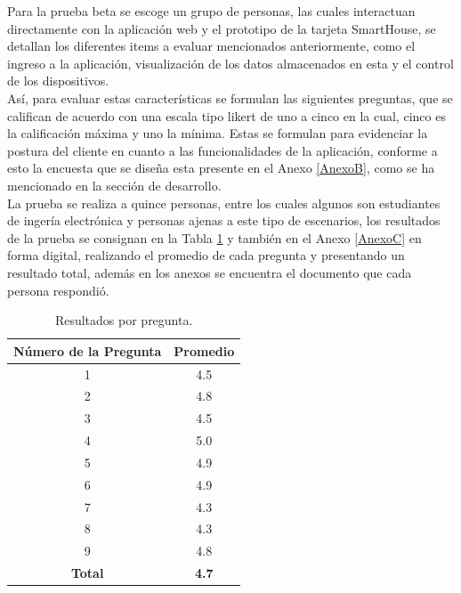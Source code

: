 
Para la prueba beta se escoge un grupo de personas, las cuales interactuan directamente con la aplicación web y el prototipo de la tarjeta SmartHouse, se detallan los diferentes items a evaluar mencionados anteriormente, como el ingreso a la aplicación, visualización de los datos almacenados en esta y el control de los dispositivos.\\

Así, para evaluar estas características se formulan las siguientes preguntas, que se califican de acuerdo con una escala tipo likert \cite{lik} de uno a cinco en la cual, cinco es la calificación máxima y uno la mínima. Estas se formulan para evidenciar la postura del cliente en cuanto a las funcionalidades de la aplicación, conforme a esto la encuesta que se diseña esta presente en el Anexo \ref{AnexoB}, como se ha mencionado en la sección de desarrollo.\\

La prueba se realiza a quince personas, entre los cuales algunos son estudiantes de ingería electrónica y personas ajenas a este tipo de escenarios, los resultados de la prueba se consignan en la Tabla \ref{table:enc} y también en el Anexo \ref{AnexoC} en forma digital, realizando el promedio de cada pregunta y presentando un resultado total, además en los anexos se encuentra el documento que cada persona respondió.\\

\begin{table}[H]
	\begin{center}
		\caption{Resultados por pregunta.}
		\label{table:enc}
		\begin{tabular}{|c|c|}
			\hline 
			\textbf{Número de la Pregunta} & \textbf{Promedio} \\ 
			\hline 
			1 & 4.5\\ 
			\hline 
			2 & 4.8\\ 
			\hline 
			3 & 4.5\\ 
			\hline 
			4 & 5.0\\ 
			\hline 
			5 & 4.9\\ 
			\hline 
			6 & 4.9\\ 
			\hline 
			7 & 4.3\\ 
			\hline 
			8 & 4.3\\ 
			\hline 
			9 & 4.8\\ 
			\hline 
			\textbf{Total} & \textbf{4.7}\\ 
			\hline 
		\end{tabular} 
	\end{center}
\end{table}

